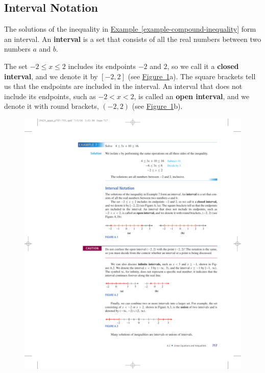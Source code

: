 \documentclass[10pt,]{book}
\newcommand{\terminology}[1]{\textbf{#1}}
\theoremstyle{plain}
\theoremstyle{definition}
\theoremstyle{definition}
\theoremstyle{definition}
\numberwithin{equation}{part}
\newcommand{\lt}{<}
\begin{document}
\subsection[{Interval Notation}]{Interval Notation}\label{subsection-12}
The solutions of the inequality in \hyperref[example-compound-inequality]{Example~\ref{example-compound-inequality}} form an interval. An \terminology{interval} is a set that consists of all the real numbers between two numbers \(a\) and \(b\).%
\par
The set \(−2 \le x \le 2\) includes its endpoints \(-2\) and \(2\), so we call it a \terminology{closed interval}, and we denote it by \([−2, 2]\) (see \hyperref[fig-numline-closed-vs-open]{Figure~\ref{fig-numline-closed-vs-open}}a). The square brackets tell us that the endpoints are included in the interval. An interval that does not include its endpoints, such as \(−2 \lt x \lt 2\), is called an \terminology{open interval}, and we denote it with round brackets, \((−2, 2)\) (see \hyperref[fig-numline-closed-vs-open]{Figure~\ref{fig-numline-closed-vs-open}}b). \leavevmode%
\begin{figure}
\centering
\includegraphics[width=1\linewidth]{images/fig-numline-closed-vs-open}
\caption{\label{fig-numline-closed-vs-open}}
\end{figure}
\end{document}
